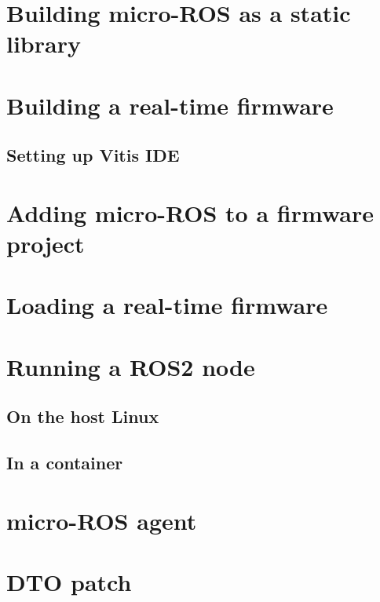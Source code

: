\documentclass[10pt]{article}
\begin{document}
\section{Building micro-ROS as a static library}
\label{sec:org9f85c56}

\section{Building a real-time firmware}
\label{sec:org6acd5b2}

\subsection{Setting up Vitis IDE}
\label{sec:orgcd7bde3}

\section{Adding micro-ROS to a firmware project}
\label{sec:org1dcd89e}

\section{Loading a real-time firmware}
\label{sec:orgedadcef}

\section{Running a ROS2 node}
\label{sec:orga90b350}

\subsection{On the host Linux}
\label{sec:orgbaa2213}

\subsection{In a container}
\label{sec:org5b6b267}

\section{micro-ROS agent}
\label{sec:org54771c1}

\appendix
\section{DTO patch}
\label{sec:orge5fe6a6}
\end{document}

